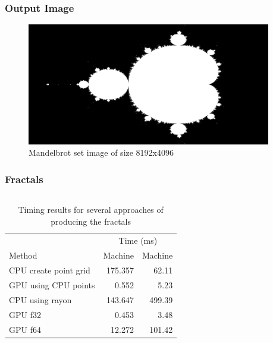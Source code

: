 \documentclass[aspectratio=169]{beamer}
\begin{document}
\begin{frame}
	\frametitle{Output Image}
	\begin{figure}[H]
		\centering
		\includegraphics[width=0.95\textwidth]{./figures/mandelbrot.png}
        \caption{Mandelbrot set image of size 8192x4096}
	\end{figure}
\end{frame}

\begin{frame}
	\frametitle{Fractals}

	\begin{columns}
		\begin{column}{0.7\textwidth}
			\begin{table}[ht]
				\centering
				\caption{Timing results for several approaches of producing the fractals}
				\begin{tabular}{l r r}
					\toprule
					                      & \multicolumn{2}{c}{Time (ms)}                  \\
					\cmidrule(lr){2-3}
					Method                & Machine\fnmark                & Machine\fnmark \\
					\midrule
					CPU create point grid & 175.357                       & 62.11          \\
					GPU using CPU points  & 0.552                         & 5.23           \\
					CPU using rayon       & 143.647                       & 499.39         \\
					\midrule
					GPU f32               & 0.453                         & 3.48           \\
					GPU f64               & 12.272                        & 101.42         \\
					\bottomrule
				\end{tabular}
			\end{table}
		\end{column}
	\end{columns}

\end{frame}
\end{document}
